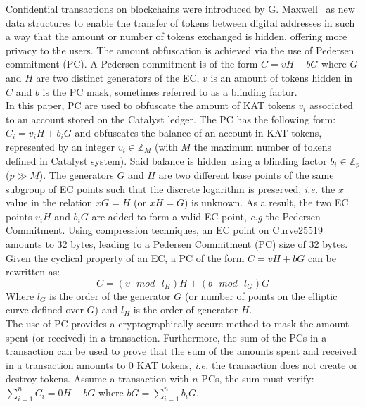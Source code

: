Confidential transactions on blockchains were introduced by G. Maxwell~\cite{confidential} as new data structures to enable the transfer of tokens between digital addresses in such a way that the amount or number of tokens exchanged is hidden, offering more privacy to the users. The amount obfuscation is achieved via the use of Pedersen commitment (PC). A Pedersen commitment is of the form  $C = vH + bG$ where $G$ and $H$ are two distinct generators of the EC, $v$ is an amount of tokens hidden in $C$ and $b$ is the PC mask, sometimes referred to as a blinding factor.\\

In this paper, PC are used to obfuscate the amount of KAT tokens $v_{i}$ associated to an account stored on the Catalyst ledger. The PC has the following form: $C_{i} = v_{i}H + b_{i}G$ and obfuscates the balance of an account in KAT tokens, represented by an integer $v_{i} \in \mathbb{Z}_M$ (with $M$ the maximum number of tokens defined in Catalyst system). Said balance is hidden using a blinding factor $b_{i} \in  \mathbb{Z}_p$ ($p \gg M$). The generators $G$ and $H$ are two different base points of the same subgroup of EC points such that the discrete logarithm is preserved, \textit{i.e.} the $x$ value in the relation $xG = H$ (or $xH = G$) is unknown. As a result, the two EC points $v_{i}H$ and $b_{i}G$ are added to form a valid EC point, \textit{e.g} the Pedersen Commitment. Using compression techniques, an EC point on Curve25519 amounts to 32 bytes, leading to a Pedersen Commitment (PC) size of 32 bytes.\\

Given the cyclical property of an EC, a PC of the form $C = vH + bG$ can be rewritten as:
\begin{equation}
C = (v \text{ $mod$ } l_H) H + (b \text{ $mod$ } l_G) G
\end{equation}
Where $l_G$ is the order of the generator $G$ (or number of points on the elliptic curve defined over $G$) and $l_H$ is the order of generator $H$.\\ 


The use of PC provides a cryptographically secure method to mask the amount spent (or received) in a transaction. Furthermore, the sum of the PCs in a transaction can be used to prove that the sum of the amounts spent and received in a transaction amounts to 0 KAT tokens, \textit{i.e.} the transaction does not create or destroy tokens. Assume a transaction with $n$ PCs, the sum must verify: $\sum_{i=1}^n C_i = 0H + bG$ where $bG = \sum_{i=1}^n b_iG$.  \\

